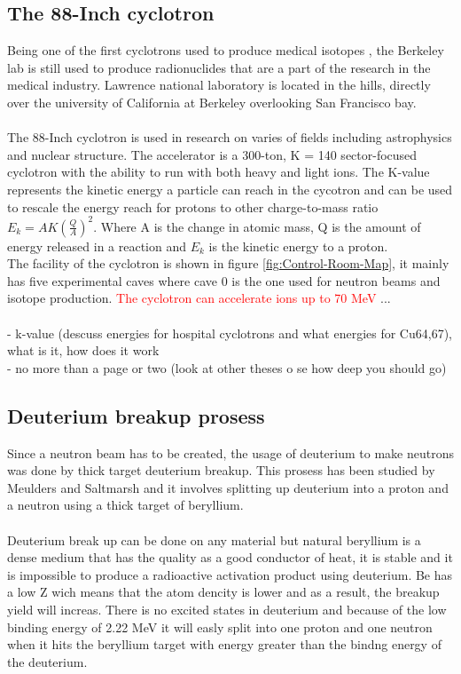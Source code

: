 \documentclass[twoside,english]{uiofysmaster/uiofysmaster}
\begin{document}
\subsection{The 88-Inch cyclotron}
\label{sec: cyclotron}

Being one of the first cyclotrons used to produce medical isotopes \cite{E.Lawrence}, the Berkeley lab is still used to produce radionuclides that are a part of the research in the medical industry. Lawrence national laboratory is located in the hills, directly over the university of California at Berkeley overlooking San Francisco bay.\\
\\
The 88-Inch cyclotron is used in research on varies of fields including astrophysics and nuclear structure. The accelerator is a 300-ton, K = 140 sector-focused cyclotron with the ability to run with both heavy and light ions. The K-value represents the kinetic energy a particle can reach in the cycotron and can be used to rescale the energy reach for protons to other charge-to-mass ratio $E_k = A K (\frac{Q}{A})^2 $. Where A is the change in atomic mass, Q is the amount of energy released in a reaction and $E_k$ is the kinetic energy to a proton.\\
The facility of the cyclotron is shown in figure \ref{fig:Control-Room-Map}, it mainly has five experimental caves where cave 0 is the one used for neutron beams and isotope production. \textcolor{red}{The cyclotron can accelerate ions up to 70 MeV}  ...
\\
\\
- k-value (descuss energies for hospital cyclotrons and what energies for Cu64,67), what is it, how does it work\\
- no more than a page or two (look at other theses o se how deep you should go)

\subsection{Deuterium breakup prosess}
\label{sec: D_breakup}

Since a neutron beam has to be created, the usage of deuterium to make neutrons was done by  thick target deuterium breakup. This prosess has been studied by Meulders \cite{Meulders} and Saltmarsh \cite{Saltmarsh1977} and it involves splitting up deuterium into a proton and a neutron using a thick target of beryllium.
\\
\\
Deuterium break up can be done on any material but natural beryllium is a dense medium that has the quality as a good conductor of heat, it is stable and it is impossible to produce a radioactive activation product using deuterium. Be has a low Z wich means that the atom dencity is lower and as a result, the breakup yield will increas.  There is no excited states in deuterium \cite{deuterium_decay} and because of the low binding energy of 2.22 MeV it will easly split into one proton and one neutron when it hits the beryllium target with energy greater than the bindng energy of the deuterium.
\end{document}
